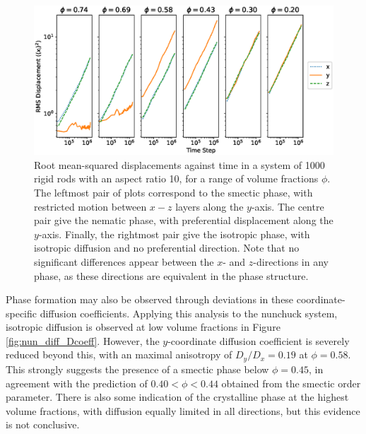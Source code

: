 \documentclass[11pt, a4paper]{article} %
\begin{document}
\begin{figure} [h!]
	\centering
	\includegraphics[width=\linewidth]{Figures/nun_diff_rmsplots}
	\caption{Root mean-squared displacements against time in a system of 1000 rigid rods with an aspect ratio 10, for a range of volume fractions $\phi$. The leftmost pair of plots correspond to the smectic phase, with restricted motion between $x-z$ layers along the $y$-axis. The centre pair give the nematic phase, with preferential displacement along the $y$-axis. Finally, the rightmost pair give the isotropic phase, with isotropic diffusion and no preferential direction. Note that no significant differences appear between the $x$- and $z$-directions in any phase, as these directions are equivalent in the phase structure.}
	\label{fig:nun_diff_rmsplots}
\end{figure}  %

Phase formation may also be observed through deviations in these coordinate-specific diffusion coefficients. Applying this analysis to the nunchuck system, isotropic diffusion is observed at low volume fractions in Figure \ref{fig:nun_diff_Dcoeff}. However, the $y$-coordinate diffusion coefficient is severely reduced beyond this, with an maximal anisotropy of $D_{y}/D_{x} = 0.19$ at $\phi = 0.58$. This strongly suggests the presence of a smectic phase below $\phi = 0.45$, in agreement with the prediction of $ 0.40<\phi<0.44$ obtained from the smectic order parameter. There is also some indication of the crystalline phase at the highest volume fractions, with diffusion equally limited in all directions, but this evidence is not conclusive.
\end{document}
